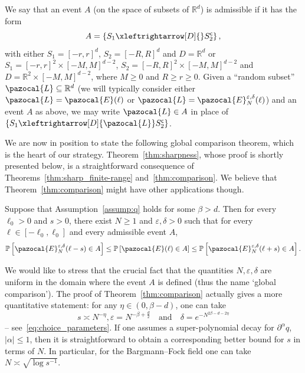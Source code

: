 \documentclass[AHL,Unicode,longabstracts,published]{cedram}
\renewcommand{\P}{\mathbb{P}}
\newcommand{\R}{\mathbb{R}}
\newcommand{\sfc}{\mathsf{c}}
\newcommand{\lr}[4]{#3\xleftrightarrow[#1]{#2} #4}
\newcommand{\R}{\mathbb{R}}
\begin{document}
\begin{defi}\label{def:admissible}
We say that an event $A$ (on the space of subsets of $\R^d$) is admissible if it has the form
\[
A=\left\{\lr{D}{}{S_1}{S_2^{\sfc}}\right\},
\]
with either $S_1=[-r,r]^d$, $S_2=[-R,R]^d$ and $D=\R^d$ or $S_1=[-r,r]^2\times[-M,M]^{d-2}$, $S_2=[-R,R]^2\times[-M,M]^{d-2}$ and $D=\R^2\times [-M,M]^{d-2}$, where $M\geq0$ and $R\geq r\geq0$. Given a ``random subset'' $\pazocal{L}\subseteq\R^d$ (we will typically consider either $\pazocal{L}=\pazocal{E}(\ell)$ or $\pazocal{L}=\pazocal{E}_N^{\varepsilon,\delta}(\ell)$) and an event $A$ as above, we may write $\pazocal{L}\in A$ in place of $\{\lr{D}{\pazocal{L}}{S_1}{S_2^{\sfc}}\}$.
\end{defi}


We are now in position to state the following global comparison theorem, which is the heart of our strategy. Theorem~\ref{thm:sharpness}, whose proof is shortly presented below, is a straightforward consequence of Theorems~\ref{thm:sharp_finite-range} and~\ref{thm:comparison}. We believe that Theorem~\ref{thm:comparison} might have other applications though.

\begin{theo}\label{thm:comparison}
Suppose that Assumption~\ref{assump:q} holds for some $\beta>d$. Then for every $\ell_0>0$ and $s>0$, there exist $N\geq1$ and $\varepsilon,\delta>0$ such that for every $\ell\in [-\ell_0,\ell_0]$ and every admissible event $A$,
\begin{equation}\label{eq:comparison}
\P\left[\pazocal{E}_N^{\varepsilon,\delta}(\ell-s)\in A\right]\leq \P\left[\pazocal{E}(\ell)\in A\right]\leq \P\left[\pazocal{E}_N^{\varepsilon,\delta}(\ell+s)\in A\right].
\end{equation}
\end{theo}

\begin{rema}\label{rmk:quantitative}
We would like to stress that the crucial fact that the quantities $N,\varepsilon,\delta$ are uniform in the domain where the event $A$ is defined (thus the name `global comparison'). The proof of Theorem~\ref{thm:comparison} actually gives a more quantitative statement: for any $\eta\in(0,\beta-d)$, one can take
\[
s\asymp N^{-\eta}, \varepsilon=N^{-\beta+\frac{d}{2}}\quad \text{and}\quad\delta=e^{-N^{2\beta-d-2\eta}}
\]
-- see~\eqref{eq:choice_parameters}. If one assumes a super-polynomial decay for $\partial^\alpha q$, $|\alpha|\leq1$, then it is straightforward to obtain a corresponding better bound for $s$ in terms of $N$. In particular, for the Bargmann--Fock field one can take $N\asymp \sqrt{\log s^{-1}}$.
\end{rema}
\end{document}
